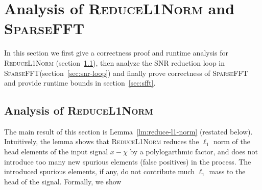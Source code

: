 \section{Analysis of \textsc{ReduceL1Norm} and \textsc{SparseFFT}}\label{sec:reduce-l1}
In this section we first give a correctness proof and runtime analysis for \textsc{ReduceL1Norm} (section~\ref{sec:rl1n}), then analyze the SNR reduction loop in \textsc{SparseFFT}(section~\ref{sec:snr-loop}) and finally prove correctness of \textsc{SparseFFT} and provide runtime bounds in section~\ref{sec:sfft}. 


\subsection{Analysis of \textsc{ReduceL1Norm}}\label{sec:rl1n}


The main result of this section is Lemma~\ref{lm:reduce-l1-norm} (restated below). Intuitively, the lemma shows that \textsc{ReduceL1Norm} reduces the $\ell_1$ norm of the head elements of the input signal $x-\chi$ by a polylogarthmic factor, and does not introduce too many new spurious elements (false positives) in the process. The  introduced spurious elements, if any, do not contribute much $\ell_1$ mass to the head of the signal. Formally, we show

